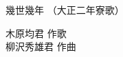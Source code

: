 \documentclass[10pt,b5j]{tarticle} %
\begin{document}
\begin{minipage}[c]{0.7\hsize} %
    \begin{center}
        {\LARGE
            幾世幾年 %
        }
        {\small 
            （大正二年寮歌） %
        }
    \end{center}
\end{minipage}
\begin{minipage}[c]{0.3\hsize} %
    \begin{flushright} %
        木原均君 作歌\\柳沢秀雄君 作曲 %
    \end{flushright}
\end{minipage}
\end{document}
